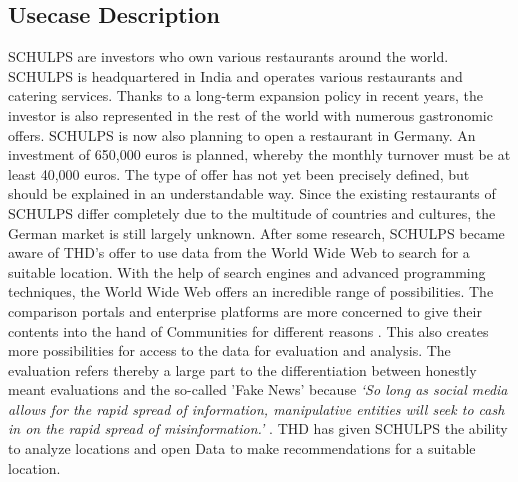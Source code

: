 \subsection{Usecase Description}
\label{subsec:usecase}
SCHULPS are investors who own various restaurants around the world. SCHULPS is headquartered in India and operates various restaurants and catering services. Thanks to a long-term expansion policy in recent years, the investor is also represented in the rest of the world with numerous gastronomic offers. SCHULPS is now also planning to open a restaurant in Germany. An investment of 650,000 euros is planned, whereby the monthly turnover must be at least 40,000 euros. The type of offer has not yet been precisely defined, but should be explained in an understandable way. Since the existing restaurants of SCHULPS differ completely due to the multitude of countries and cultures, the German market is still largely unknown. After some research, SCHULPS became aware of THD's offer to use data from the World Wide Web to search for a suitable location. With the help of search engines and advanced programming techniques, the World Wide Web offers an incredible range of possibilities. The comparison portals and enterprise platforms are more concerned to give their contents into the hand of Communities for different reasons \cite{socialbusiness}. This also creates more possibilities for access to the data for evaluation and analysis. The evaluation refers thereby a large part to the differentiation between honestly meant evaluations and the so-called 'Fake News' because \textit{`So long as social media allows for the rapid spread of information, manipulative entities will seek to cash in on the rapid spread of misinformation.'} \cite{fakenews}.
THD has given SCHULPS the ability to analyze locations and open Data to make recommendations for a suitable location.
